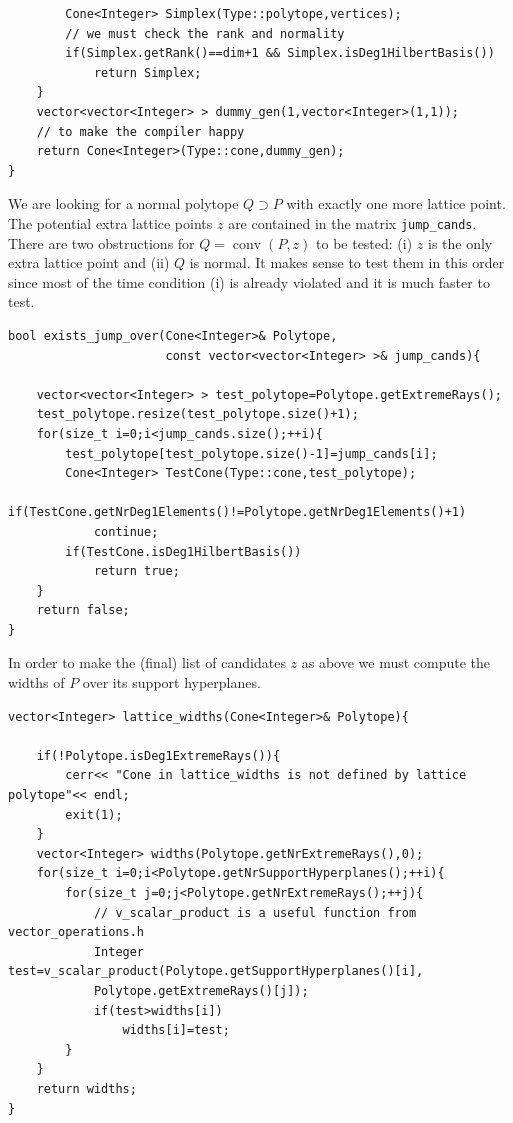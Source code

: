 \begin{small}
\begin{Verbatim}
        Cone<Integer> Simplex(Type::polytope,vertices);
        // we must check the rank and normality
        if(Simplex.getRank()==dim+1 && Simplex.isDeg1HilbertBasis())
            return Simplex;
    }
    vector<vector<Integer> > dummy_gen(1,vector<Integer>(1,1)); 
    // to make the compiler happy
    return Cone<Integer>(Type::cone,dummy_gen); 
}
\end{Verbatim}

We are looking for a normal polytope $Q\supset P$ with exactly one more lattice point. The potential extra lattice points $z$ are contained in the matrix \verb|jump_cands|. There are two obstructions for $Q=\operatorname{conv}(P,z)$ to be tested: (i) $z$ is the only extra lattice point and (ii) $Q$ is normal. It makes sense to test them in this order since most of the time condition (i) is already violated and it is much faster to test.
\begin{Verbatim}
bool exists_jump_over(Cone<Integer>& Polytope, 
                      const vector<vector<Integer> >& jump_cands){

    vector<vector<Integer> > test_polytope=Polytope.getExtremeRays();
    test_polytope.resize(test_polytope.size()+1); 
    for(size_t i=0;i<jump_cands.size();++i){
        test_polytope[test_polytope.size()-1]=jump_cands[i];
        Cone<Integer> TestCone(Type::cone,test_polytope);
        if(TestCone.getNrDeg1Elements()!=Polytope.getNrDeg1Elements()+1)
            continue;
        if(TestCone.isDeg1HilbertBasis())
            return true;
    }
    return false;
}
\end{Verbatim}

In order to make the (final) list of candidates $z$ as above we must compute the widths of $P$ over its support hyperplanes.
\begin{Verbatim}
vector<Integer> lattice_widths(Cone<Integer>& Polytope){

    if(!Polytope.isDeg1ExtremeRays()){
        cerr<< "Cone in lattice_widths is not defined by lattice polytope"<< endl;
        exit(1);
    }
    vector<Integer> widths(Polytope.getNrExtremeRays(),0);
    for(size_t i=0;i<Polytope.getNrSupportHyperplanes();++i){
        for(size_t j=0;j<Polytope.getNrExtremeRays();++j){
            // v_scalar_product is a useful function from vector_operations.h
            Integer test=v_scalar_product(Polytope.getSupportHyperplanes()[i],
            Polytope.getExtremeRays()[j]);
            if(test>widths[i])
                widths[i]=test;
        }
    }
    return widths;
}
\end{Verbatim}


\end{small}
